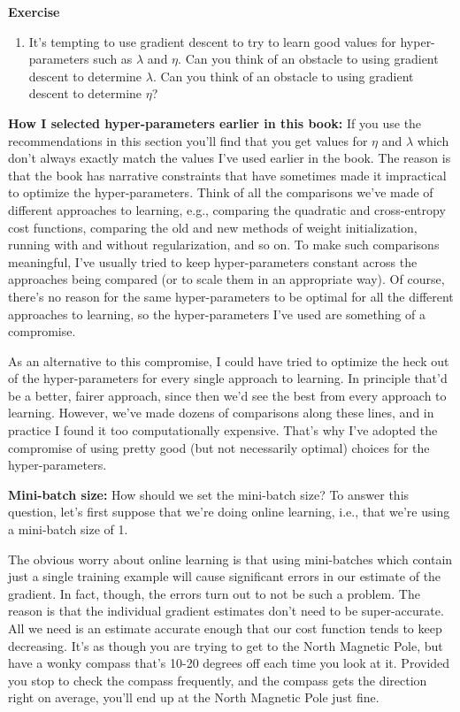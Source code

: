 \textbf{Exercise}

\begin{enumerate}
\item It's tempting to use gradient descent to try to learn good values for hyper-parameters such as $\lambda$     and $\eta$. Can you think of an obstacle to using gradient descent to determine $\lambda$. Can you think of an obstacle to using gradient descent to determine $\eta$?    
\end{enumerate}

\textbf{How I selected hyper-parameters earlier in this book:} If you use the recommendations in this section you'll find that you get values for $\eta$ and $\lambda$ which don't always exactly match the values I've used earlier in the book. The reason is that the book has narrative constraints that have sometimes made it impractical to optimize the hyper-parameters. Think of all the comparisons we've made of different approaches to learning, e.g., comparing the quadratic and cross-entropy cost functions, comparing the old and new methods of weight initialization, running with and without regularization, and so on. To make such comparisons meaningful, I've usually tried to keep hyper-parameters constant across the approaches being compared (or to scale them in an appropriate way). Of course, there's no reason for the same hyper-parameters to be optimal for all the different approaches to learning, so the hyper-parameters I've used are something of a compromise.

As an alternative to this compromise, I could have tried to optimize the heck out of the hyper-parameters for every single approach to learning. In principle that'd be a better, fairer approach, since then we'd see the best from every approach to learning. However, we've made dozens of comparisons along these lines, and in practice I found it too computationally expensive. That's why I've adopted the compromise of using pretty good (but not necessarily optimal) choices for the hyper-parameters.

\textbf{Mini-batch size:}\label{page:minibatchsize} How should we set the mini-batch size? To answer this question, let's first suppose that we're doing online learning, i.e., that we're using a mini-batch size of 1.

The obvious worry about online learning is that using mini-batches which contain just a single training example will cause significant errors in our estimate of the gradient. In fact, though, the errors turn out to not be such a problem. The reason is that the individual gradient estimates don't need to be super-accurate. All we need is an estimate accurate enough that our cost function tends to keep decreasing. It's as though you are trying to get to the North Magnetic Pole, but have a wonky compass that's 10-20 degrees off each time you look at it. Provided you stop to check the compass frequently, and the compass gets the direction right on average, you'll end up at the North Magnetic Pole just fine.


